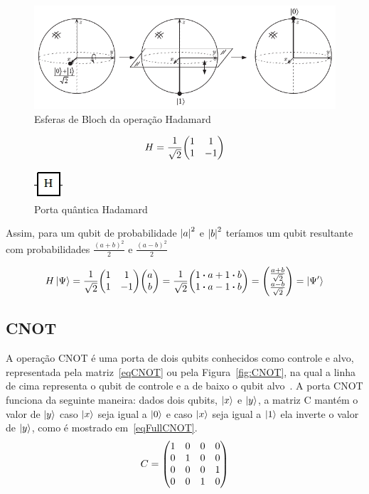 \documentclass[a4paper, 12pt, oneside]{book}
\begin{document}
\begin{figure}[H]
\centering
\includegraphics[scale=0.6]{h_sphere.png}
\caption{Esferas de Bloch da operação Hadamard}
\label{fig:h_sphere}
\end{figure}

\begin{equation}\label{eqH}
H =  \frac{1}{\sqrt{2}}\mqty(1&1\\1&-1)
\end{equation}

\begin{figure}[H]
\centering
\includegraphics[scale=0.75]{h.jpg}
\caption{Porta quântica Hadamard}
\label{fig:H}
\end{figure}

Assim, para um qubit de probabilidade $\abs{a}^2$ e $\abs{b}^2$ teríamos um qubit resultante com probabilidades $\frac{(a+b)^2}{2}$ e $\frac{(a-b)^2}{2}$

\begin{equation}
H\ket{\Psi} = \frac{1}{\sqrt{2}}\mqty(1&1\\1&-1)\mqty(a\\b) = \frac{1}{\sqrt{2}}\mqty(1 \vdot a+1 \vdot b \\1 \vdot a-1 \vdot b) = \mqty( \frac{a+b}{\sqrt{2}} \\ \frac{a-b}{\sqrt{2}} ) = \ket{\Psi'}
\end{equation}

\subsection{CNOT} \label{sec:cnot}
A operação CNOT é uma porta de dois qubits conhecidos como controle e alvo, representada pela matriz~\eqref{eqCNOT} ou pela Figura~\ref{fig:CNOT}, na qual a linha de cima representa o qubit de controle e a de baixo o qubit alvo~\cite{mermin}. A porta CNOT funciona da seguinte maneira: dados dois qubits, $\ket{x}$ e $\ket{y}$, a matriz C mantém o valor de $\ket{y}$ caso $\ket{x}$ seja igual a $\ket{0}$ e caso $\ket{x}$ seja igual a $\ket{1}$ ela inverte o valor de $\ket{y}$, como é mostrado em~\eqref{eqFullCNOT}.
\begin{equation}\label{eqCNOT}
C =  \mqty(1&0&0&0\\0&1&0&0\\0&0&0&1\\0&0&1&0)
\end{equation}
\end{document}
